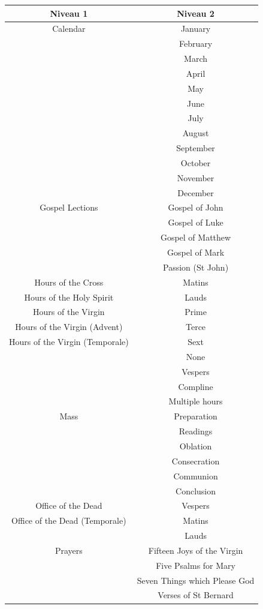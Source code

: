 \documentclass[a4paper,12pt,twoside]{book}
\begin{document}
\begin{table}[h!]
\centering
\begin{longtable}{|c|c|}
\hline
\textbf{Niveau 1} & \textbf{Niveau 2} \\ 
\hline
Calendar & January \\ 
& February \\ 
& March \\ 
& April \\ 
& May \\ 
& June \\ 
& July \\ 
& August \\ 
& September \\ 
& October \\ 
& November \\ 
& December \\ 
\hline
Gospel Lections & Gospel of John \\
& Gospel of Luke \\
& Gospel of Matthew \\
& Gospel of Mark \\
& Passion (St John) \\ 
\hline
Hours of the Cross & Matins\\ 
Hours of the Holy Spirit & Lauds\\
Hours of the Virgin & Prime\\
Hours of the Virgin (Advent) & Terce\\
Hours of the Virgin (Temporale) &  Sext\\ 
& None \\
& Vespers \\
& Compline \\
& Multiple hours \\ 
\hline
Mass & Preparation \\
& Readings \\
& Oblation \\
& Consecration \\
& Communion \\
& Conclusion \\ 
\hline
Office of the Dead & Vespers\\
Office of the Dead (Temporale) &  Matins\\
& Lauds  \\
\hline
Prayers & Fifteen Joys of the Virgin \\
& Five Psalms for Mary \\
& Seven Things which Please God \\
& Verses of St Bernard \\ 
\cline{1-2}
\end{longtable}
\end{table}
\end{document}
